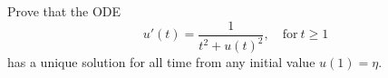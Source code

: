 

Prove that the ODE 
\[
u'(t) = \frac 1 {t^2 + u(t)^2}, \quad \mbox{for}~t \geq 1
\]
has a unique solution for all time from any initial value $u(1)=\eta$.


